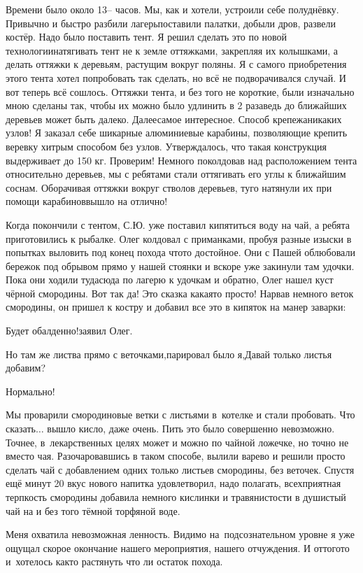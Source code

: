 Времени было около 13\thinspace\nobreakdash-- часов. Мы, как и хотели, устроили себе полуднёвку. Привычно и быстро разбили лагерь\mdash поставили палатки, добыли дров, развели костёр. Надо было поставить тент. Я решил сделать это по новой технологии\mdash натягивать тент не к земле оттяжками, закрепляя их колышками, а делать оттяжки к деревьям, растущим вокруг поляны. Я с самого приобретения этого тента хотел попробовать так сделать, но всё не подворачивался случай. И вот теперь всё сошлось. Оттяжки тента, и без того не короткие, были изначально мною сделаны так, чтобы их можно было удлинить в 2 раза\mdash ведь до ближайших деревьев может быть далеко. Далее\mdash самое интересное. Способ крепежа\mdash никаких узлов! Я заказал себе шикарные алюминиевые карабины, позволяющие крепить веревку хитрым способом без узлов. Утверждалось, что такая конструкция выдерживает до 150 кг. Проверим! Немного поколдовав над расположением тента относительно деревьев, мы с ребятами стали оттягивать его углы к ближайшим соснам. Оборачивая оттяжки вокруг стволов деревьев, туго натянули их при помощи карабинов\mdash вышло на отлично!

Когда покончили с тентом, С.Ю. уже поставил кипятиться воду на чай, а ребята приготовились к рыбалке. Олег колдовал с приманками, пробуя разные изыски в попытках выловить под конец похода что\sdash то достойное. Они с Пашей облюбовали бережок под обрывом прямо у нашей стоянки и вскоре уже закинули там удочки. Пока они ходили туда\sdash сюда по лагерю к удочкам и обратно, Олег нашел куст чёрной смородины. Вот так да! Это сказка какая\sdash то просто! Нарвав немного веток смородины, он пришел к костру и добавил все это в кипяток на манер заварки:

\diagdash Будет обалденно!\mdash заявил Олег.

\diagdash Но там же листва прямо с веточками,\mdash парировал было я,\mdash Давай только листья добавим?

\diagdash Нормально!

Мы проварили смородиновые ветки с листьями в~котелке и стали пробовать. Что сказать$\ldots$ вышло кисло, даже очень. Пить это было совершенно невозможно. Точнее, в~лекарственных целях может и можно по чайной ложечке, но точно не вместо чая. Разочаровавшись в таком способе, вылили варево и решили просто сделать чай с добавлением одних только листьев смородины, без веточек. Спустя ещё минут 20 вкус нового напитка удовлетворил, надо полагать, всех\mdash приятная терпкость смородины добавила немного кислинки и травянистости в душистый чай на и без того тёмной торфяной воде. 

Меня охватила невозможная ленность. Видимо на~подсознательном уровне я уже ощущал скорое окончание нашего мероприятия, нашего отчуждения. И оттого\sdash то и~хотелось как\sdash то растянуть что ли остаток похода.

\begin{center}
\end{center}
